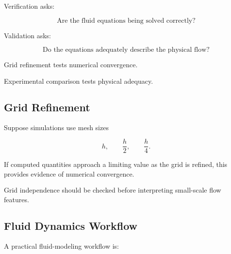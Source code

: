 Verification asks:

\[
\boxed{
\text{Are the fluid equations being solved correctly?}
}
\]

Validation asks:

\[
\boxed{
\text{Do the equations adequately describe the physical flow?}
}
\]

Grid refinement tests numerical convergence.

Experimental comparison tests physical adequacy.

\subsection{Grid Refinement}
\label{subsec:fluid-grid-refinement}

Suppose simulations use mesh sizes

\[
h,
\qquad
\frac{h}{2},
\qquad
\frac{h}{4}.
\]

If computed quantities approach a limiting value as the grid is refined,
this provides evidence of numerical convergence.

Grid independence should be checked before interpreting small-scale flow
features.

\subsection{Fluid Dynamics Workflow}
\label{subsec:fluid-dynamics-workflow}

A practical fluid-modeling workflow is:

